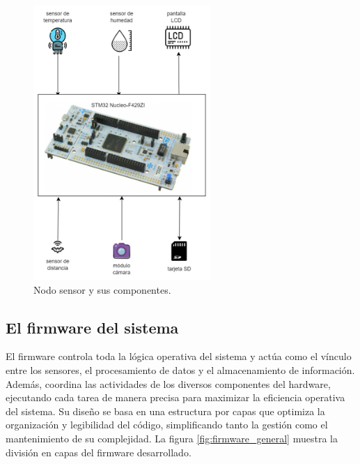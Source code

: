 \vspace{1cm}

\begin{figure}[htbp]
	\centering
	\includegraphics[width=0.6\textwidth, height=0.39\textheight]{./Figures/nodo_sensor.png}
	\caption{Nodo sensor y sus componentes.}
	\label{fig:nodo_sensor}
\end{figure}

\vspace{1cm}

\newpage

\subsection{El firmware del sistema}

El firmware controla toda la lógica operativa del sistema y actúa como el vínculo entre los sensores, el procesamiento de datos y el almacenamiento de información. Además, coordina las actividades de los diversos componentes del hardware, ejecutando cada tarea de manera precisa para maximizar la eficiencia operativa del sistema. Su diseño se basa en una estructura por capas que optimiza la organización y legibilidad del código, simplificando tanto la gestión como el mantenimiento de su complejidad. La figura \ref{fig:firmware_general} muestra la división en capas del firmware desarrollado.

\newpage


